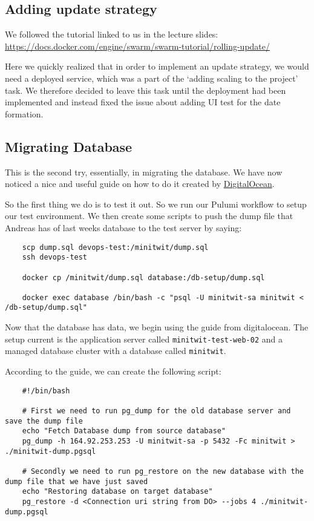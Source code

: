 \subsection{Adding update strategy}
\label{log:adding-update-strategy}

We followed the tutorial linked to us in the lecture slides: \url{https://docs.docker.com/engine/swarm/swarm-tutorial/rolling-update/}

Here we quickly realized that in order to implement an update strategy, we would need a deployed service, which was a part of the `adding scaling to the project' task. We therefore decided to leave this task until the deployment had been implemented and instead fixed the issue about adding UI test for the date formation.

\subsection{Migrating Database}
\label{log:migrating-database}

This is the second try, essentially, in migrating the database. We have now noticed a nice and useful guide on how to do it created by \href{https://docs.digitalocean.com/products/databases/postgresql/how-to/import-databases/}{DigitalOcean}.

So the first thing we do is to test it out. So we run our Pulumi workflow to setup our test environment. We then create some scripts to push the dump file that Andreas has of last weeks database to the test server by saying:
\begin{verbatim}
    scp dump.sql devops-test:/minitwit/dump.sql
    ssh devops-test

    docker cp /minitwit/dump.sql database:/db-setup/dump.sql

    docker exec database /bin/bash -c "psql -U minitwit-sa minitwit < /db-setup/dump.sql"
\end{verbatim}

Now that the database has data, we begin using the guide from digitalocean. The setup current is the application server called \texttt{minitwit-test-web-02} and a managed database cluster with a database called \texttt{minitwit}.

According to the guide, we can create the following script:

\begin{verbatim}
    #!/bin/bash

    # First we need to run pg_dump for the old database server and save the dump file
    echo "Fetch Database dump from source database"
    pg_dump -h 164.92.253.253 -U minitwit-sa -p 5432 -Fc minitwit > ./minitwit-dump.pgsql

    # Secondly we need to run pg_restore on the new database with the dump file that we have just saved
    echo "Restoring database on target database"
    pg_restore -d <Connection uri string from DO> --jobs 4 ./minitwit-dump.pgsql
\end{verbatim}

